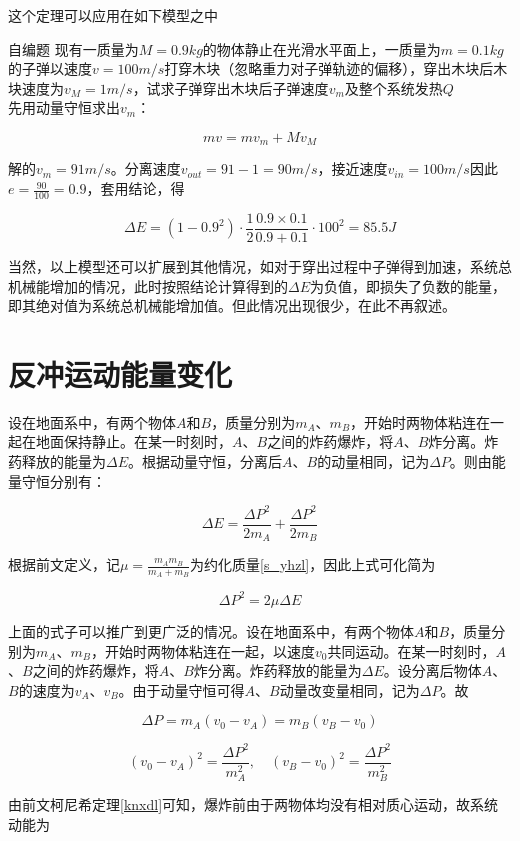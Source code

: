这个定理可以应用在如下模型之中

\begin{ep}{自编题}{}
现有一质量为$M=0.9kg$的物体静止在光滑水平面上，一质量为$m=0.1kg$的子弹以速度$v=100m/s$打穿木块（忽略重力对子弹轨迹的偏移），穿出木块后木块速度为$v_M = 1m/s$，试求子弹穿出木块后子弹速度$v_m$及整个系统发热$Q$
~\\

先用动量守恒求出$v_m$：

$$m v = m v_m + M v_M$$

解的$v_m = 91m/s$。分离速度$v_{out} =  91 - 1 = 90m/s$，接近速度$v_{in} = 100m/s$因此$e = \frac{90}{100} = 0.9$，套用结论，得

$$\Delta E = (1 - 0.9^2) \cdot \frac{1}{2} \frac{0.9 \times 0.1}{0.9 + 0.1} \cdot 100^2 = 85.5J$$
\end{ep}

当然，以上模型还可以扩展到其他情况，如对于穿出过程中子弹得到加速，系统总机械能增加的情况，此时按照结论计算得到的$\Delta E$为负值，即损失了负数的能量，即其绝对值为系统总机械能增加值。但此情况出现很少，在此不再叙述。

\section{反冲运动能量变化}

设在地面系中，有两个物体$A$和$B$，质量分别为$m_A$、$m_B$，开始时两物体粘连在一起在地面保持静止。在某一时刻时，$A$、$B$之间的炸药爆炸，将$A$、$B$炸分离。炸药释放的能量为$\Delta E$。根据动量守恒，分离后$A$、$B$的动量相同，记为$\Delta P$。则由能量守恒分别有：

$$\Delta E = \frac{\Delta P^2}{2 m_A} + \frac{\Delta P^2}{2 m_B}$$

根据前文定义，记$\mu = \frac{m_A m_B}{m_A + m_B}$为约化质量\eqref{s_yhzl}，因此上式可化简为

$$\Delta P^2 = 2 \mu \Delta E$$

上面的式子可以推广到更广泛的情况。设在地面系中，有两个物体$A$和$B$，质量分别为$m_A$、$m_B$，开始时两物体粘连在一起，以速度$v_0$共同运动。在某一时刻时，$A$、$B$之间的炸药爆炸，将$A$、$B$炸分离。炸药释放的能量为$\Delta E$。设分离后物体$A$、$B$的速度为$v_A$、$v_B$。由于动量守恒可得$A$、$B$动量改变量相同，记为$\Delta P$。故

$$\Delta P = m_A (v_0 - v_A) = m_B (v_B - v_0)$$

$$(v_0 - v_A)^2 = \frac{\Delta P^2}{m_A^2} ,\quad (v_B - v_0)^2 = \frac{\Delta P^2}{m_B^2}$$

由前文柯尼希定理\eqref{knxdl}可知，爆炸前由于两物体均没有相对质心运动，故系统动能为

